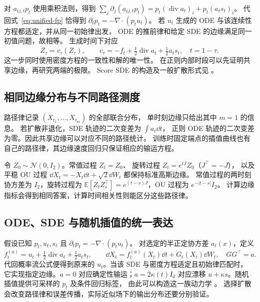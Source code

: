 对 \(a_{ij,t}p_t\) 使用乘积法则，得到
\(\sum_j\partial_j(a_{ij,t}p_t)
=p_t(\operatorname{div}a_t)_i+p_t(a_ts_t)_i\)。
代回式~\eqref{eq:unified-fp} 恰得到
\(\partial_t p_t=-\nabla\cdot(p_tu_t)\)。
若 \(u_t\) 生成的 ODE 与该连续性方程都适定，并从同一初始律出发，
ODE 的推前律和给定 SDE 的边缘满足同一初值问题，故相等。
生成时间下对应
\begin{equation}
 \dot Z_\tau=v_\tau(Z_\tau),\qquad
 v_\tau=-f_t+\tfrac12\operatorname{div}a_t+\tfrac12a_ts_t,
 \quad t=1-\tau.
 \label{eq:unified-probability-flow}
\end{equation}
这一步同时使用密度方程的一致性和解的唯一性。
在正则内部时段可以先证明共享边缘，再研究两端的极限。
Score SDE 的构造及一般扩散形式见 \cite{song2021sde}。

\subsection{相同边缘分布与不同路径测度}

路径律记录 \((X_{t_1},\ldots,X_{t_m})\) 的全部联合分布，
单时刻边缘只给出其中 \(m=1\) 的信息。
若扩散非退化，SDE 轨迹的二次变差为 \(\int a_t\dd t\)，
正则 ODE 轨迹的二次变差为零。因此共享边缘可以对应不同的路径统计。
训练时固定端点的插值曲线也有自己的路径律，其边缘速度回归只保证相应的输运方程。

\begin{example}[共享标准高斯边缘的三种过程]
令 \(Z_0\sim\mathcal N(0,I_2)\)。常值过程 \(Z_t=Z_0\)、
旋转过程 \(Z_t=e^{tJ}Z_0\)（\(J^\top=-J\)），
以及平稳 OU 过程 \(\dd X_t=-X_t\dd t+\sqrt2\dd W_t\)
都保持标准高斯边缘。
常值过程的两时刻协方差为 \(I_2\)，旋转过程为
\(\mathbb E[Z_tZ_s^\top]=e^{(t-s)J}\)，OU 过程为 \(e^{-|t-s|}I_2\)。
计算边缘指标会得到相同答案，计算时间相关性则能区分这些路径律。
\end{example}

\subsection{ODE、SDE 与随机插值的统一表达}

假设已知 \(p_t,u_t,s_t\) 且 \(\partial_t p_t=-\nabla\cdot(p_tu_t)\)。
对选定的半正定协方差 \(a_t(x)\)，定义
\begin{equation}
 f_t^{(a)}=u_t+\tfrac12\operatorname{div}a_t+\tfrac12a_ts_t,
 \qquad
 \dd X_t=f_t^{(a)}(X_t)\dd t+G_t(X_t)\dd W_t,
 \quad GG^\top=a.
 \label{eq:unified-diffusion-family}
\end{equation}
代回概率流公式便得到原来的 \(u_t\)。当该 SDE 与密度方程适定且初始律匹配时，
它实现指定边缘。\(a=0\) 对应确定性输运；\(a=2\kappa(t)I_d\)
对应漂移 \(u+\kappa s\)。随机插值提供可采样的 \(p_t\) 及条件回归标签，
由此可以构造这一族动力学 \cite{albergo2025si}。
选择扩散会改变路径律和误差传播，实际近似场下的输出分布还要分别验证。

